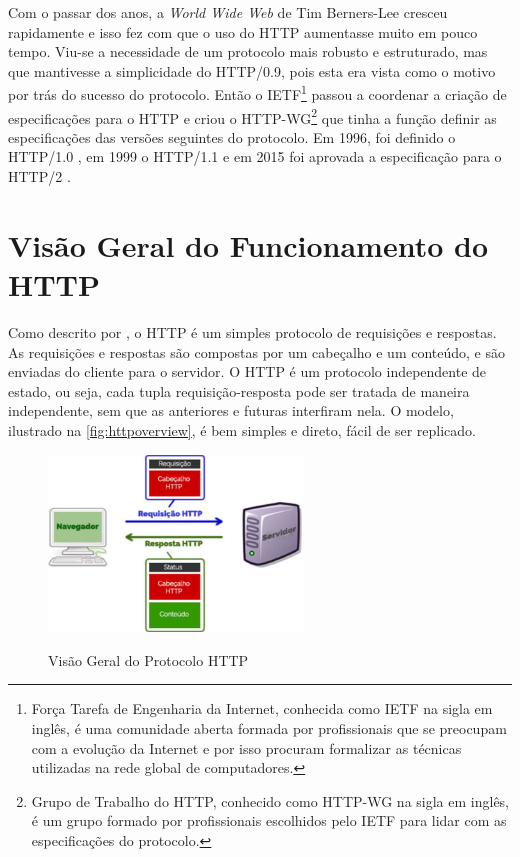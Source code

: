 Com o passar dos anos, a \textit{World Wide Web} de Tim Berners-Lee cresceu rapidamente e isso fez com que o uso do HTTP aumentasse muito em pouco tempo. Viu-se a necessidade de um protocolo mais robusto e estruturado, mas que mantivesse a simplicidade do HTTP/0.9, pois esta era vista como o motivo por trás do sucesso do protocolo. Então o IETF\footnote{Força Tarefa de Engenharia da Internet, conhecida como IETF na sigla em inglês, é uma comunidade aberta formada por profissionais que se preocupam com a evolução da Internet e por isso procuram formalizar as técnicas utilizadas na rede global de computadores.} passou a coordenar a criação de especificações para o HTTP e criou o HTTP-WG\footnote{Grupo de Trabalho do HTTP, conhecido como HTTP-WG na sigla em inglês, é um grupo formado por profissionais escolhidos pelo IETF para lidar com as especificações do protocolo.} que tinha a função definir as especificações das versões seguintes do protocolo. Em 1996, foi definido o HTTP/1.0 \cite{RFC1945}, em 1999 o HTTP/1.1 \cite{RFC2616} e em 2015 foi aprovada a especificação para o HTTP/2 \cite{HTTP2Spec}.

\section{Visão Geral do Funcionamento do HTTP}
\label{sec:http_visão_geral}

Como descrito por , o HTTP é um simples protocolo de requisições e respostas. As requisições e respostas são compostas por um cabeçalho e um conteúdo, e são enviadas do cliente para o servidor. O HTTP é um protocolo independente de estado, ou seja, cada tupla requisição-resposta pode ser tratada de maneira independente, sem que as anteriores e futuras interfiram nela. O modelo, ilustrado na \autoref{fig:httpoverview}, é bem simples e direto, fácil de ser replicado.

\begin{figure}[!htb]
    \centering
    \caption{Visão Geral do Protocolo HTTP}
    \includegraphics[width=0.6\textwidth]{./04-figuras/fund-teorica/http_overview}
    \label{fig:httpoverview}
\end{figure}

